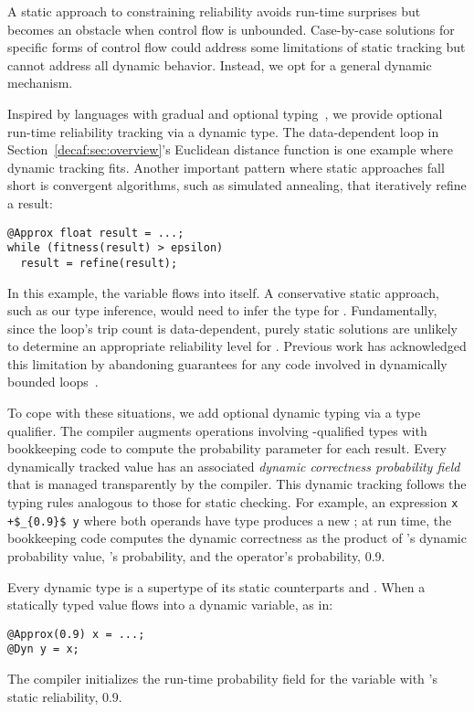 {A static approach to constraining reliability avoids run-time surprises but
becomes an obstacle when control flow is unbounded.
Case-by-case solutions for specific forms of control flow could address some
limitations of static tracking but cannot address all dynamic behavior.
Instead, we opt for a general dynamic mechanism.

Inspired by languages with gradual and optional typing~\cite{gradualfp},
we provide optional run-time reliability tracking via a dynamic type.
The data-dependent loop in Section~\ref{decaf:sec:overview}'s Euclidean
distance function is one example where dynamic tracking fits.
Another important pattern where static approaches fall short is convergent
algorithms, such as simulated annealing, that iteratively refine a result:
%
\begin{lstlisting}
@Approx float result = ...;
while (fitness(result) > epsilon)
  result = refine(result);
\end{lstlisting}
%
In this example, the  variable flows into itself.
A conservative static approach, such as our type inference, would need to infer
the type  for .
Fundamentally, since the loop's trip count is data-dependent, purely static
solutions are unlikely to determine an appropriate reliability level for
.
Previous work has acknowledged this limitation by abandoning guarantees for
any code involved in dynamically bounded loops~\cite{rely}.

To cope with these situations, we add optional dynamic typing via a
 type qualifier.
The compiler augments operations involving -qualified types with
bookkeeping code to compute the probability parameter for each result.
Every dynamically tracked value has an associated \emph{dynamic correctness
probability field} that is managed transparently by the compiler.
This dynamic tracking follows the typing rules analogous to those for static
checking.
For example, an expression \lstinline!x +$_{0.9}$ y! where both operands have type
 produces a new ; at run time, the
bookkeeping code computes the dynamic correctness as the product of 's
dynamic probability value, 's probability, and the operator's
probability, 0.9.

Every dynamic type  is a supertype of its static
counterparts  and .
When a statically typed value flows into a dynamic variable, as in:
%
\begin{lstlisting}
@Approx(0.9) x = ...;
@Dyn y = x;
\end{lstlisting}
%
The compiler initializes the run-time probability field for the variable
 with 's static reliability, 0.9.

}
